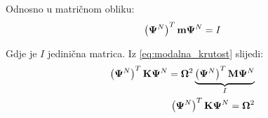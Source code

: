 Odnosno u matričnom obliku:
\begin{equation}\label{eq:relacija_normirani_matricno}
    \left(\mathbf{\Psi}^N\right)^T\mathbf{m}\mathbf{\Psi}^N=I
\end{equation}

Gdje je $I$ jedinična matrica. Iz \eqref{eq:modalna_krutost} slijedi:
\begin{equation}
    \begin{split}
        \left(\mathbf{\Psi}^N\right)^T\mathbf{K}\mathbf{\Psi}^N=\mathbf{\Omega}^2\underbrace{\left(\mathbf{\Psi}^N\right)^T\mathbf{M}\mathbf{\Psi}^N}_{\text{$I$}} \notag\\
        \left(\mathbf{\Psi}^N\right)^T\mathbf{K}\mathbf{\Psi}^N=\mathbf{\Omega}^2\label{eq:normirana_krutost}
    \end{split}
\end{equation}


